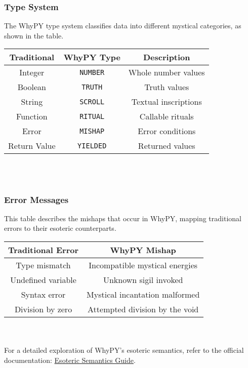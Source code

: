 \documentclass[conference]{IEEEtran}
\begin{document}
\subsubsection{Type System}
The WhyPY type system classifies data into different mystical categories, as shown in the table. \\
\par \vspace{1sp} 
\begin{tabular}{|c|c|c|}
\hline
\textbf{Traditional} & \textbf{WhyPY Type} & \textbf{Description} \\
\hline
Integer & \texttt{NUMBER} & Whole number values \\
Boolean & \texttt{TRUTH} & Truth values \\
String & \texttt{SCROLL} & Textual inscriptions \\
Function & \texttt{RITUAL} & Callable rituals \\
Error & \texttt{MISHAP} & Error conditions \\
Return Value & \texttt{YIELDED} & Returned values \\
\hline
\end{tabular}
\\ 
\\

\subsubsection{Error Messages}
This table describes the mishaps that occur in WhyPY, mapping traditional errors to their esoteric counterparts. \\
\par \vspace{1mm} 
\begin{tabular}{|c|c|}
\hline
\textbf{Traditional Error} & \textbf{WhyPY Mishap} \\
\hline
Type mismatch & Incompatible mystical energies \\
Undefined variable & Unknown sigil invoked \\
Syntax error & Mystical incantation malformed \\
Division by zero & Attempted division by the void \\
\hline
\end{tabular}
\\
\\

For a detailed exploration of WhyPY’s esoteric semantics, refer to the official documentation: \href{https://why-py.vercel.app/language-guide/esoteric-semantics/}{Esoteric Semantics Guide}.
\end{document}
